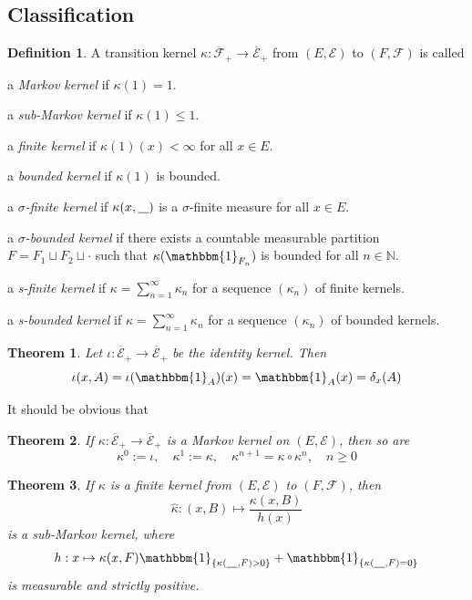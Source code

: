 \documentclass[11pt, a4paper, openany]{book}
\newtheorem{thm}{Theorem}\newtheorem{lem}{Lemma}\newtheorem{crl}{Corollary}
\theoremstyle{definition}
\newtheorem{define}{Definition}\newtheorem{exam}{Example}\newtheorem{remark}{Remark}
\newcommand{\ph}{\underline{\hspace{0.3cm}}}
\newenvironment{tight_enumerate}{\begin{enumerate}\itemsep -0.2em}{\end{enumerate}}
\begin{document}
\subsection{Classification}
    \begin{define}
        A transition kernel $\kappa:\overline{\mathscr{F}}_+\rightarrow \overline{\mathscr{E}}_+$ from $(E,\mathscr{E})$ to $(F,\mathscr{F})$ is called 
        \begin{tight_enumerate}
            \item a \textit{Markov kernel} if $\kappa(1)=1$.
            \item a \textit{sub-Markov kernel} if $\kappa(1)\leqslant 1$.
            \item a \textit{finite kernel} if $\kappa(1)(x)<\infty$ for all $x\in E$.
            \item a \textit{bounded kernel} if $\kappa(1)$ is bounded.
            \item a \textit{$\sigma$-finite kernel} if $\kappa(x,\ph)$ is a $\sigma$-finite measure for all $x\in E$.
            \item a \textit{$\sigma$-bounded kernel} if there exists a countable measurable partition $F=F_1\sqcup F_2\sqcup \cdot$ such that $\kappa(\mathbbm{1}_{F_n})$ is bounded for all $n\in\mathbb{N}$.
            \item a \textit{s-finite kernel} if $\kappa=\sum_{n=1}^\infty\kappa_n$ for a sequence $(\kappa_n)$ of finite kernels.
            \item a \textit{s-bounded kernel} if $\kappa=\sum_{n=1}^\infty\kappa_n$ for a sequence $(\kappa_n)$ of bounded kernels.
        \end{tight_enumerate}
    \end{define}
    \begin{thm}
        Let $\iota:\overline{\mathscr{E}}_+\rightarrow \overline{\mathscr{E}}_+$ be the identity kernel. Then
        \[
            \iota(x,A)=\iota(\mathbbm{1}_A)(x)=\mathbbm{1}_A(x)=\delta_x(A)
        \]
    \end{thm}
    It should be obvious that
    \begin{thm}
        If $\kappa:\overline{\mathscr{E}}_+\rightarrow \overline{\mathscr{E}}_+$ is a Markov kernel on $(E,\mathscr{E})$, then so are
        \[
            \kappa^0:=\iota,\quad\kappa^1:=\kappa,\quad\kappa^{n+1}=\kappa\circ\kappa^n,\quad n\geqslant 0
        \]
    \end{thm}
    \begin{thm}
        If $\kappa$ is a finite kernel from $(E,\mathscr{E})$ to $(F,\mathscr{F})$, then
        \[
            \hat{\kappa}:(x,B)\mapsto \frac{\kappa(x,B)}{h(x)}
        \]
        is a sub-Markov kernel, where
        \[
            h:x\mapsto 
            \kappa(x,F)\mathbbm{1}_{\{\kappa(\ph,F)>0\}}+\mathbbm{1}_{\{\kappa(\ph,F)=0\}}
        \]
        is measurable and strictly positive.
    \end{thm}
\end{document}
